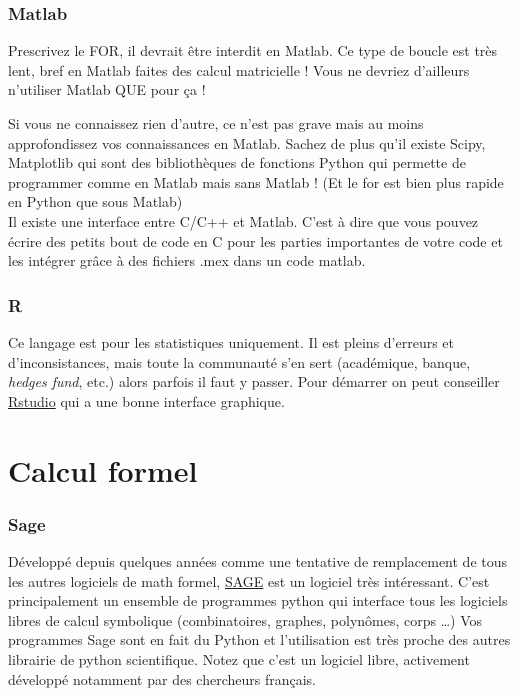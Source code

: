 

\subsubsection*{Matlab}

Prescrivez le FOR, il devrait être interdit en Matlab. Ce type de boucle est très lent, bref en Matlab 
faites des calcul matricielle ! Vous ne devriez d'ailleurs n'utiliser Matlab QUE pour ça !

Si vous ne connaissez rien d'autre, ce n'est pas grave mais au moins approfondissez vos connaissances 
en Matlab.  Sachez de plus qu'il existe Scipy, Matplotlib  qui sont des bibliothèques de fonctions Python 
qui permette de programmer comme en Matlab mais sans Matlab ! (Et le for est bien plus rapide 
en Python que sous Matlab)\\

Il existe une interface entre C/C++ et Matlab. C'est à dire que vous pouvez écrire des petits bout de code en C
pour les parties importantes de votre code et les intégrer grâce à des fichiers .mex dans un code matlab.


\subsubsection*{R} Ce langage est pour les statistiques uniquement. 
Il est pleins d'erreurs et d'inconsistances, mais
toute la communauté s'en sert (académique, banque, \textit{hedges fund}, etc.) alors parfois 
il faut y passer. 
Pour démarrer on peut conseiller \href{http://www.rstudio.com/}{Rstudio} qui a une bonne interface graphique.

\section{Calcul formel}


\subsubsection*{Sage}
Développé depuis quelques années comme une tentative de remplacement de tous les
autres logiciels de math formel,  \href{http://www.sagemath.org/}{SAGE} est un logiciel très intéressant.
C'est principalement un ensemble de programmes python qui interface tous les logiciels
libres de calcul symbolique (combinatoires, graphes, polynômes, corps \dots)
Vos programmes Sage sont en fait du Python et l'utilisation est très proche des 
autres librairie de python scientifique.
Notez que c'est un logiciel libre, activement développé notamment par des chercheurs français.



